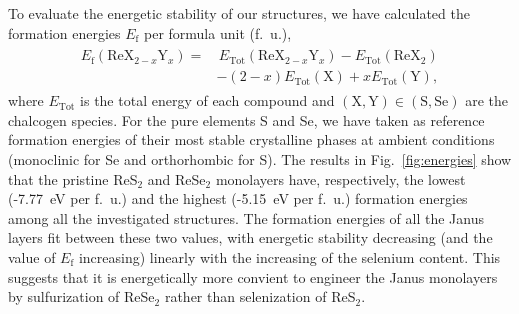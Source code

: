 \documentclass[reprint, superscriptaddress, amsmath,amssymb,prb,twocolumn]{revtex4-2}
\begin{document}
To evaluate the energetic stability of our structures, we have calculated the formation energies $E_{\mathrm{f}}$ per formula unit (f.~u.),
\begin{align}\begin{split} \label{eq:nrg}
E_{\mathrm{f}}(\mathrm{ReX}_{2-x}\mathrm{Y}_x) = &\, E_{\mathrm{Tot}}(\mathrm{ReX}_{2-x}\mathrm{Y}_x) - E_{\mathrm{Tot}}(\mathrm{ReX}_2)  \\
&- (2-x)E_{\mathrm{Tot}}(\mathrm{X}) + xE_{\mathrm{Tot}}(\mathrm{Y}), 
\end{split}\end{align}
where $E_{\mathrm{Tot}}$ is the total energy of each compound and $\mathrm{(X,Y)\in(S,Se)}$ are the chalcogen species. For the pure elements S and Se, we have taken as reference formation energies of their most stable crystalline phases at ambient conditions (monoclinic for Se and orthorhombic for S). The results in Fig.~\ref{fig:energies} show that the pristine ReS$_{2}$ and ReSe$_{2}$ monolayers have, respectively, the lowest (-7.77~eV per f.~u.) and the highest (-5.15~eV per f.~u.) formation energies among all the investigated structures. The formation energies of all the Janus layers fit between these two values, with energetic stability decreasing (and the value of $E_{\mathrm{f}}$ increasing) linearly with the increasing of the selenium content. This suggests that it is energetically more convient to engineer the Janus monolayers by sulfurization of ReSe$_{2}$ rather than selenization of ReS$_{2}$.  
\end{document}
